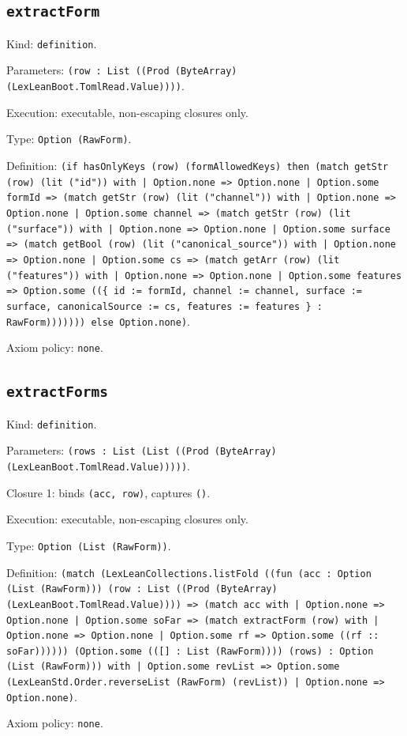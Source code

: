 \documentclass[11pt]{article}
\begin{document}
\subsection*{\texttt{extractForm}}
\noindent Kind: \texttt{definition}.\par
\noindent Parameters: \texttt{(row : List ((Prod (ByteArray) (LexLeanBoot.TomlRead.Value))))}.\par
\noindent Execution: executable, non-escaping closures only.\par
\noindent Type: \texttt{Option (RawForm)}.\par
\noindent Definition: \texttt{(if hasOnlyKeys (row) (formAllowedKeys) then (match getStr (row) (lit ("id")) with | Option.none => Option.none | Option.some formId => (match getStr (row) (lit ("channel")) with | Option.none => Option.none | Option.some channel => (match getStr (row) (lit ("surface")) with | Option.none => Option.none | Option.some surface => (match getBool (row) (lit ("canonical\_source")) with | Option.none => Option.none | Option.some cs => (match getArr (row) (lit ("features")) with | Option.none => Option.none | Option.some features => Option.some ((\{ id := formId, channel := channel, surface := surface, canonicalSource := cs, features := features \} : RawForm))))))) else Option.none)}.\par
\noindent Axiom policy: \texttt{none}.\par
\subsection*{\texttt{extractForms}}
\noindent Kind: \texttt{definition}.\par
\noindent Parameters: \texttt{(rows : List (List ((Prod (ByteArray) (LexLeanBoot.TomlRead.Value)))))}.\par
\noindent Closure 1: binds \texttt{(acc, row)}, captures \texttt{()}.\par
\noindent Execution: executable, non-escaping closures only.\par
\noindent Type: \texttt{Option (List (RawForm))}.\par
\noindent Definition: \texttt{(match (LexLeanCollections.listFold ((fun (acc : Option (List (RawForm))) (row : List ((Prod (ByteArray) (LexLeanBoot.TomlRead.Value)))) => (match acc with | Option.none => Option.none | Option.some soFar => (match extractForm (row) with | Option.none => Option.none | Option.some rf => Option.some ((rf :: soFar)))))) (Option.some (([] : List (RawForm)))) (rows) : Option (List (RawForm))) with | Option.some revList => Option.some (LexLeanStd.Order.reverseList (RawForm) (revList)) | Option.none => Option.none)}.\par
\noindent Axiom policy: \texttt{none}.\par
\end{document}
